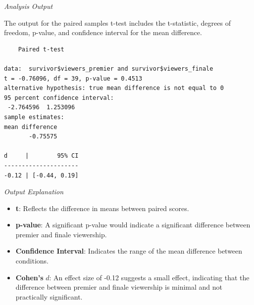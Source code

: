 \documentclass[
]{book}
\newenvironment{Shaded}{\begin{snugshade}}{\end{snugshade}}
\newcommand{\AttributeTok}[1]{\textcolor[rgb]{0.13,0.29,0.53}{#1}}
\newcommand{\CommentTok}[1]{\textcolor[rgb]{0.56,0.35,0.01}{\textit{#1}}}
\newcommand{\ConstantTok}[1]{\textcolor[rgb]{0.56,0.35,0.01}{#1}}
\newcommand{\FunctionTok}[1]{\textcolor[rgb]{0.13,0.29,0.53}{\textbf{#1}}}
\newcommand{\NormalTok}[1]{#1}
\newcommand{\OtherTok}[1]{\textcolor[rgb]{0.56,0.35,0.01}{#1}}
\newcommand{\SpecialCharTok}[1]{\textcolor[rgb]{0.81,0.36,0.00}{\textbf{#1}}}
\providecommand{\tightlist}{%
  \setlength{\itemsep}{0pt}\setlength{\parskip}{0pt}}
\begin{document}
\begin{Shaded}
\end{Shaded}

\emph{Analysis Output}

The output for the paired samples t-test includes the t-statistic, degrees of freedom, p-value, and confidence interval for the mean difference.

\begin{verbatim}
    Paired t-test

data:  survivor$viewers_premier and survivor$viewers_finale
t = -0.76096, df = 39, p-value = 0.4513
alternative hypothesis: true mean difference is not equal to 0
95 percent confidence interval:
 -2.764596  1.253096
sample estimates:
mean difference 
       -0.75575 

d     |        95% CI
---------------------
-0.12 | [-0.44, 0.19]
\end{verbatim}

\emph{Output Explanation}

\begin{itemize}
\tightlist
\item
  \textbf{t}: Reflects the difference in means between paired scores.
\item
  \textbf{p-value}: A significant p-value would indicate a significant difference between premier and finale viewership.
\item
  \textbf{Confidence Interval}: Indicates the range of the mean difference between conditions.
\item
  \textbf{Cohen's} \(d\): An effect size of -0.12 suggests a small effect, indicating that the difference between premier and finale viewership is minimal and not practically significant.
\end{itemize}
\end{document}
